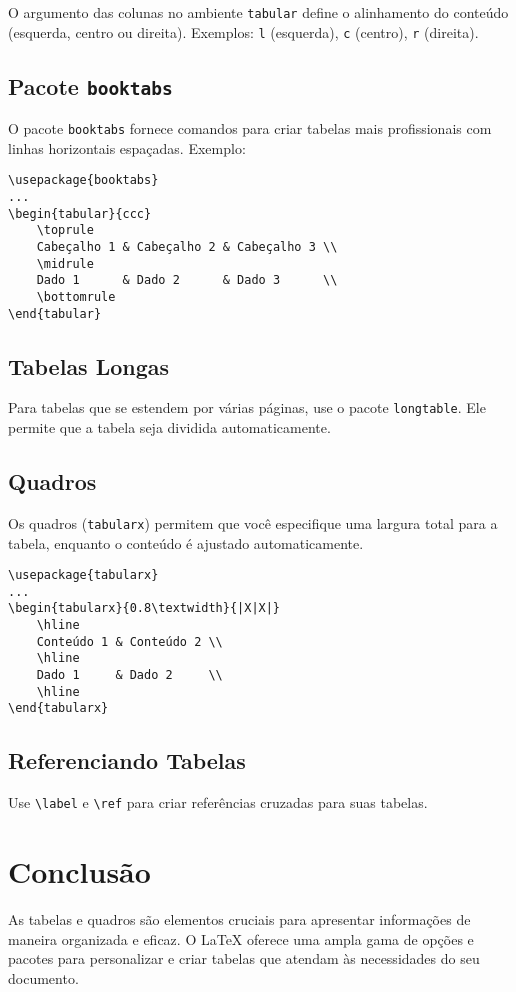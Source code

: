 \documentclass{article}
\begin{document}
O argumento das colunas no ambiente \texttt{tabular} define o alinhamento do conteúdo (esquerda, centro ou direita). Exemplos: \texttt{l} (esquerda), \texttt{c} (centro), \texttt{r} (direita).

\subsection{Pacote \texttt{booktabs}}

O pacote \texttt{booktabs} fornece comandos para criar tabelas mais profissionais com linhas horizontais espaçadas. Exemplo:

\begin{verbatim}
\usepackage{booktabs}
...
\begin{tabular}{ccc}
    \toprule
    Cabeçalho 1 & Cabeçalho 2 & Cabeçalho 3 \\
    \midrule
    Dado 1      & Dado 2      & Dado 3      \\
    \bottomrule
\end{tabular}
\end{verbatim}

\subsection{Tabelas Longas}

Para tabelas que se estendem por várias páginas, use o pacote \texttt{longtable}. Ele permite que a tabela seja dividida automaticamente.

\subsection{Quadros}

Os quadros (\texttt{tabularx}) permitem que você especifique uma largura total para a tabela, enquanto o conteúdo é ajustado automaticamente.

\begin{verbatim}
\usepackage{tabularx}
...
\begin{tabularx}{0.8\textwidth}{|X|X|}
    \hline
    Conteúdo 1 & Conteúdo 2 \\
    \hline
    Dado 1     & Dado 2     \\
    \hline
\end{tabularx}
\end{verbatim}

\subsection{Referenciando Tabelas}

Use \texttt{\textbackslash label} e \texttt{\textbackslash ref} para criar referências cruzadas para suas tabelas.

\section{Conclusão}

As tabelas e quadros são elementos cruciais para apresentar informações de maneira organizada e eficaz. O LaTeX oferece uma ampla gama de opções e pacotes para personalizar e criar tabelas que atendam às necessidades do seu documento.
\end{document}
